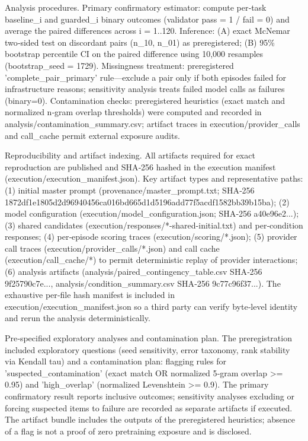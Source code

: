 \documentclass[conference]{IEEEtran}
\begin{document}
Analysis procedures. Primary confirmatory estimator: compute per‑task baseline\_i and guarded\_i binary outcomes (validator pass = 1 / fail = 0) and average the paired differences across i = 1..120. Inference: (A) exact McNemar two‑sided test on discordant pairs (n\_10, n\_01) as preregistered; (B) 95\% bootstrap percentile CI on the paired difference using 10,000 resamples (bootstrap\_seed = 1729). Missingness treatment: preregistered 'complete\_pair\_primary' rule---exclude a pair only if both episodes failed for infrastructure reasons; sensitivity analysis treats failed model calls as failures (binary=0). Contamination checks: preregistered heuristics (exact match and normalized n‑gram overlap thresholds) were computed and recorded in analysis/contamination\_summary.csv; artifact traces in execution/provider\_calls and call\_cache permit external exposure audits.

Reproducibility and artifact indexing. All artifacts required for exact reproduction are published and SHA‑256 hashed in the execution manifest (execution/execution\_manifest.json). Key artifact types and representative paths: (1) initial master prompt (provenance/master\_prompt.txt; SHA‑256 1872df1e1805d2d96940456ca016bd665d1d5196add77f5acdf1582bb39b15ba); (2) model configuration (execution/model\_configuration.json; SHA‑256 a40e96e2...); (3) shared candidates (execution/responses/*-shared-initial.txt) and per‑condition responses; (4) per‑episode scoring traces (execution/scoring/*.json); (5) provider call traces (execution/provider\_calls/*.json) and call cache (execution/call\_cache/*) to permit deterministic replay of provider interactions; (6) analysis artifacts (analysis/paired\_contingency\_table.csv SHA‑256 9f25790c7e..., analysis/condition\_summary.csv SHA‑256 9c77c96f37...). The exhaustive per‑file hash manifest is included in execution/execution\_manifest.json so a third party can verify byte‑level identity and rerun the analysis deterministically.

Pre‑specified exploratory analyses and contamination plan. The preregistration included exploratory questions (seed sensitivity, error taxonomy, rank stability via Kendall tau) and a contamination plan: flagging rules for 'suspected\_contamination' (exact match OR normalized 5‑gram overlap >= 0.95) and 'high\_overlap' (normalized Levenshtein >= 0.9). The primary confirmatory result reports inclusive outcomes; sensitivity analyses excluding or forcing suspected items to failure are recorded as separate artifacts if executed. The artifact bundle includes the outputs of the preregistered heuristics; absence of a flag is not a proof of zero pretraining exposure and is disclosed.
\end{document}
